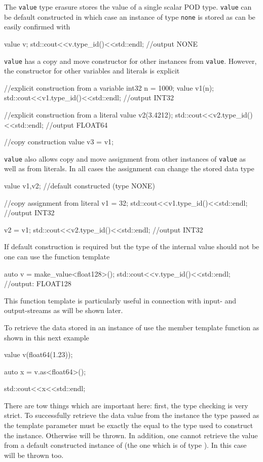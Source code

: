 The \texttt{value} type erasure stores the value of a single scalar POD type. 
\texttt{value} can be default constructed in which case an instance of type 
\texttt{none} is stored as can be easily confirmed with
\begin{cppcode}
value v;
std::cout<<v.type_id()<<std::endl; //output NONE
\end{cppcode}
\texttt{value} has a copy and move constructor for other instances from 
\texttt{value}. However, the constructor for other variables and literals is 
explicit 
\begin{cppcode}
//explicit construction from a variable
int32 n = 1000;
value v1(n);     
std::cout<<v1.type_id()<<std::endl; //output INT32

//explicit construction from a literal
value v2(3.4212); 
std::cout<<v2.type_id()<<std::endl; //output FLOAT64

//copy construction
value v3 = v1;
\end{cppcode}
\texttt{value} also allows copy and move assignment from other instances of
\texttt{value} as well as from literals. In all cases the assignment can change the
stored data type
\begin{cppcode}
value v1,v2;  //default constructed  (type NONE)

//copy assignment from literal
v1 = 32;  
std::cout<<v1.type_id()<<std::endl;  //output INT32

v2 = v1;
std::cout<<v2.type_id()<<std::endl;  //output INT32
\end{cppcode}
If default construction is required but the type of the internal value should
not be  one can use the  function template 
\begin{cppcode}
auto v = make_value<float128>();
std::cout<<v.type_id()<<std::endl; //output: FLOAT128
\end{cppcode}
This function template is particularly useful in connection with input- and
output-streams as will be shown later. 

To retrieve the data stored in an instance of  use the 
member template function as shown in this next example
\begin{cppcode}
value v(float64(1.23));

auto x = v.as<float64>();

std::cout<<x<<std::endl;
\end{cppcode}
There are tow things which are important here: first, the type checking is very
strict. To successfully retrieve the data value from the  instance
the type passed as the template parameter must be exactly the equal to the type
used to construct the  instance. Otherwise  will be
thrown. In addition, one cannot retrieve the value from a default constructed
instance of  (the one which is of type ). In this case 
 will be thrown too.

